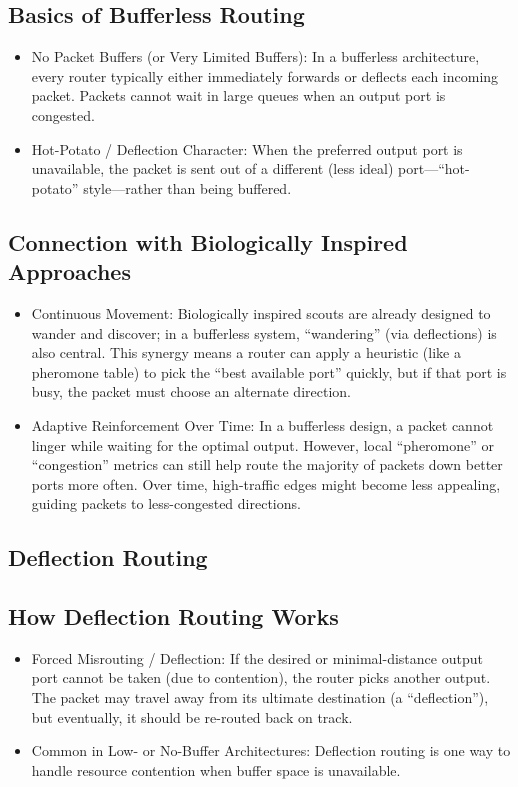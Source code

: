 \documentclass[../OAE-SPEC-MAIN.tex]{subfiles}
\begin{document}
\subsection{Basics of Bufferless Routing}

\begin{itemize}
\item No Packet Buffers (or Very Limited Buffers): In a bufferless architecture, every router typically either immediately forwards or deflects each incoming packet. Packets cannot wait in large queues when an output port is congested.
\item Hot-Potato / Deflection Character: When the preferred output port is unavailable, the packet is sent out of a different (less ideal) port—``hot-potato'' style—rather than being buffered.
\end{itemize}

\subsection{Connection with Biologically Inspired Approaches}
\begin{itemize}
\item Continuous Movement: Biologically inspired scouts are already designed to wander and discover; in a bufferless system, “wandering” (via deflections) is also central. This synergy means a router can apply a heuristic (like a pheromone table) to pick the “best available port” quickly, but if that port is busy, the packet must choose an alternate direction.
\item Adaptive Reinforcement Over Time: In a bufferless design, a packet cannot linger while waiting for the optimal output. However, local “pheromone” or “congestion” metrics can still help route the majority of packets down better ports more often. Over time, high-traffic edges might become less appealing, guiding packets to less-congested directions.
\end{itemize}

\subsection{Deflection Routing}

\subsection{How Deflection Routing Works}

\begin{itemize}
\item Forced Misrouting / Deflection: If the desired or minimal-distance output port cannot be taken (due to contention), the router picks another output. The packet may travel away from its ultimate destination (a “deflection”), but eventually, it should be re-routed back on track.
\item Common in Low- or No-Buffer Architectures: Deflection routing is one way to handle resource contention when buffer space is unavailable.
\end{itemize}
%
\end{document}
